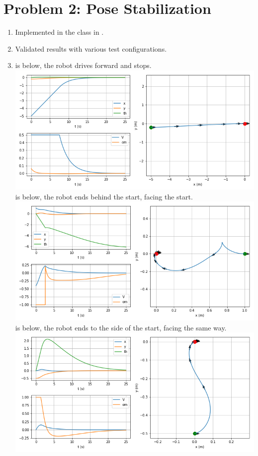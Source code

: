 \documentclass{article}
\begin{document}
\section*{Problem 2: Pose Stabilization}
\begin{enumerate}[label=(\roman*)]
\item Implemented  in the  class in .

\item Validated results with various test configurations.

\item {} is below, the robot drives forward and stops. \\
\includegraphics[scale=0.5]{plots/sim_parking_forward.png} \\
 is below, the robot ends behind the start, facing the start. \\
\includegraphics[scale=0.5]{plots/sim_parking_reverse.png} \\
 is below, the robot ends to the side of the start, facing the same way. \\
\includegraphics[scale=0.5]{plots/sim_parking_parallel.png}


\end{enumerate}
\end{document}

